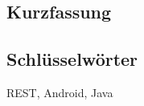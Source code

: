 
\cleardoublepage
{}


\begin{otherlanguage}{ngerman}

  \chapter*{Kurzfassung}


  \section*{Schl\"usselw\"orter}
  REST, Android, Java

\end{otherlanguage}

